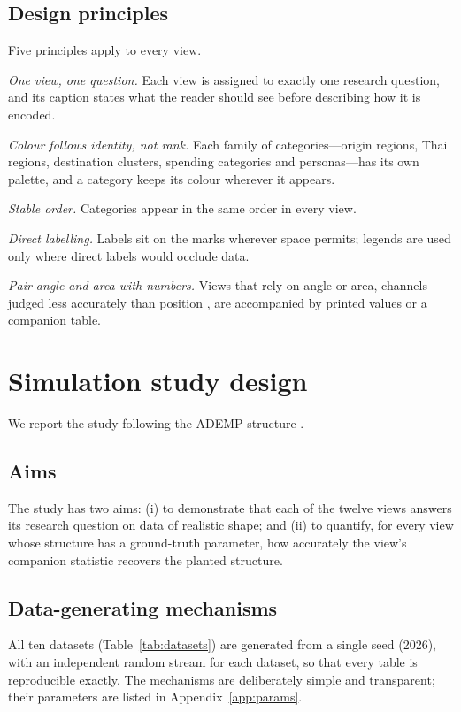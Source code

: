 \documentclass[11pt,a4paper]{article}
\begin{document}
\subsection{Design principles}
Five principles apply to every view.
\begin{description}[leftmargin=2.2em,labelwidth=1.8em,itemsep=2pt]
  \item[D1] \emph{One view, one question.} Each view is assigned to exactly one research question, and its
        caption states what the reader should see before describing how it is encoded.
  \item[D2] \emph{Colour follows identity, not rank.} Each family of categories---origin regions, Thai regions,
        destination clusters, spending categories and personas---has its own palette, and a category keeps its
        colour wherever it appears.
  \item[D3] \emph{Stable order.} Categories appear in the same order in every view.
  \item[D4] \emph{Direct labelling.} Labels sit on the marks wherever space permits; legends are used only where
        direct labels would occlude data.
  \item[D5] \emph{Pair angle and area with numbers.} Views that rely on angle or area, channels judged less
        accurately than position \citep{cleveland1984}, are accompanied by printed values or a companion table.
\end{description}

\section{Simulation study design}\label{sec:study}

We report the study following the ADEMP structure \citep{morris2019}.

\subsection{Aims}
The study has two aims: (i) to demonstrate that each of the twelve views answers its research question on data
of realistic shape; and (ii) to quantify, for every view whose structure has a ground-truth parameter, how
accurately the view's companion statistic recovers the planted structure.

\subsection{Data-generating mechanisms}\label{sec:dgm}
All ten datasets (Table~\ref{tab:datasets}) are generated from a single seed (2026), with an independent random
stream for each dataset, so that every table is reproducible exactly. The mechanisms are deliberately simple
and transparent; their parameters are listed in Appendix~\ref{app:params}.
\end{document}
